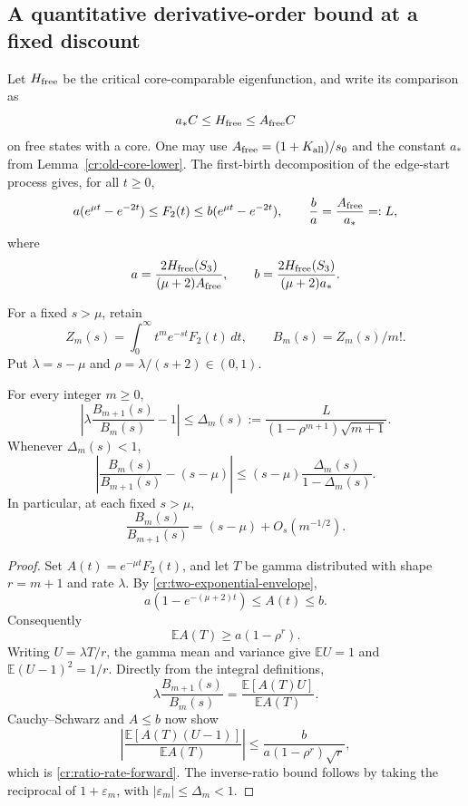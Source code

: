 
\subsection{A quantitative derivative-order bound at a fixed discount}

Let $H_{\rm free}$ be the critical core-comparable eigenfunction, and
write its comparison as
\[
 a_*C\le H_{\rm free}\le A_{\rm free}C
\]
on free states with a core.  One may use
$A_{\rm free}=(1+K_{\rm all})/s_0$ and the constant $a_*$ from
Lemma~\ref{cr:old-core-lower}.  The first-birth decomposition of the
edge-start process gives, for all $t\ge0$,
\begin{equation}
 a(e^{\mu t}-e^{-2t})\le F_2(t)
 \le b(e^{\mu t}-e^{-2t}),
 \qquad \frac ba=\frac{A_{\rm free}}{a_*}=:L,
 \label{cr:two-exponential-envelope}
\end{equation}
where
\[
 a=\frac{2H_{\rm free}(S_3)}{(\mu+2)A_{\rm free}},
 \qquad b=\frac{2H_{\rm free}(S_3)}{(\mu+2)a_*}.
\]

For a fixed $s>\mu$, retain
\[
 Z_m(s)=\int_0^\infty t^m e^{-st}F_2(t)\,dt,
 \qquad B_m(s)=Z_m(s)/m!.
\]
Put $\lambda=s-\mu$ and $\rho=\lambda/(s+2)\in(0,1)$.

\begin{proposition}
\label{cr:derivative-ratio-rate}
For every integer $m\ge0$,
\begin{equation}
 \left|\lambda\frac{B_{m+1}(s)}{B_m(s)}-1\right|
 \le\Delta_m(s):=
 \frac{L}{(1-\rho^{m+1})\sqrt{m+1}}.
 \label{cr:ratio-rate-forward}
\end{equation}
Whenever $\Delta_m(s)<1$,
\begin{equation}
 \left|\frac{B_m(s)}{B_{m+1}(s)}-(s-\mu)\right|
 \le (s-\mu)\frac{\Delta_m(s)}{1-\Delta_m(s)}.
 \label{cr:ratio-rate-inverse}
\end{equation}
In particular, at each fixed $s>\mu$,
\[
 \frac{B_m(s)}{B_{m+1}(s)}=(s-\mu)+O_s(m^{-1/2}).
\]
\end{proposition}
\begin{proof}
Set $A(t)=e^{-\mu t}F_2(t)$, and let $T$ be gamma distributed with
shape $r=m+1$ and rate $\lambda$.  By
\eqref{cr:two-exponential-envelope},
\[
 a(1-e^{-(\mu+2)t})\le A(t)\le b.
\]
Consequently
\[
 \mathbb EA(T)\ge a(1-\rho^r).
\]
Writing $U=\lambda T/r$, the gamma mean and variance give
$\mathbb EU=1$ and $\mathbb E(U-1)^2=1/r$.  Directly from the integral
definitions,
\[
 \lambda\frac{B_{m+1}(s)}{B_m(s)}
 =\frac{\mathbb E[A(T)U]}{\mathbb EA(T)}.
\]
Cauchy--Schwarz and $A\le b$ now show
\[
 \left|\frac{\mathbb E[A(T)(U-1)]}{\mathbb EA(T)}\right|
 \le\frac{b}{a(1-\rho^r)\sqrt r},
\]
which is \eqref{cr:ratio-rate-forward}.  The inverse-ratio bound follows
by taking the reciprocal of $1+\varepsilon_m$, with
$|\varepsilon_m|\le\Delta_m<1$.
\end{proof}

